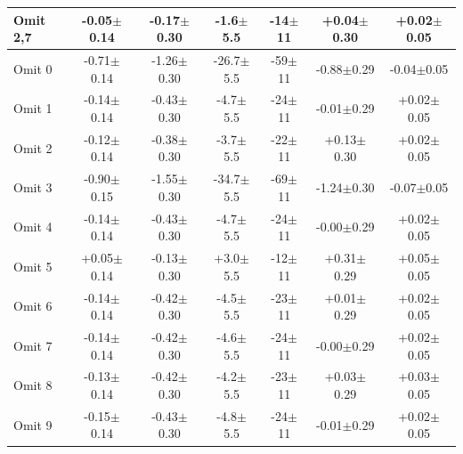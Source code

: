 \begin{landscape}
\begin{table}[!h]
\begin{center}
\begin{tabular}[h]{|l|c|c|c|c|c|c|}
Omit 2,7& -0.05$\pm$0.14& -0.17$\pm$0.30& -1.6$\pm$5.5& -14$\pm$11& +0.04$\pm$0.30& +0.02$\pm$0.05\\\hline
Omit 0& \color{red}-0.71$\pm$0.14& \color{red}-1.26$\pm$0.30& \color{red}-26.7$\pm$5.5& \color{red}-59$\pm$11& -0.88$\pm$0.29& -0.04$\pm$0.05\\\hline
Omit 1& -0.14$\pm$0.14& -0.43$\pm$0.30& -4.7$\pm$5.5& -24$\pm$11& -0.01$\pm$0.29& +0.02$\pm$0.05\\\hline
Omit 2& -0.12$\pm$0.14& -0.38$\pm$0.30& -3.7$\pm$5.5& -22$\pm$11& +0.13$\pm$0.30& +0.02$\pm$0.05\\\hline
Omit 3& \color{red}-0.90$\pm$0.15& \color{red}-1.55$\pm$0.30& \color{red}-34.7$\pm$5.5& \color{red}-69$\pm$11& \color{red}-1.24$\pm$0.30& -0.07$\pm$0.05\\\hline
Omit 4& -0.14$\pm$0.14& -0.43$\pm$0.30& -4.7$\pm$5.5& -24$\pm$11& -0.00$\pm$0.29& +0.02$\pm$0.05\\\hline
Omit 5& +0.05$\pm$0.14& -0.13$\pm$0.30& +3.0$\pm$5.5& -12$\pm$11& +0.31$\pm$0.29& +0.05$\pm$0.05\\\hline
Omit 6& -0.14$\pm$0.14& -0.42$\pm$0.30& -4.5$\pm$5.5& -23$\pm$11& +0.01$\pm$0.29& +0.02$\pm$0.05\\\hline
Omit 7& -0.14$\pm$0.14& -0.42$\pm$0.30& -4.6$\pm$5.5& -24$\pm$11& -0.00$\pm$0.29& +0.02$\pm$0.05\\\hline
Omit 8& -0.13$\pm$0.14& -0.42$\pm$0.30& -4.2$\pm$5.5& -23$\pm$11& +0.03$\pm$0.29& +0.03$\pm$0.05\\\hline
Omit 9& -0.15$\pm$0.14& -0.43$\pm$0.30& -4.8$\pm$5.5& -24$\pm$11& -0.01$\pm$0.29& +0.02$\pm$0.05\\\hline
\end{tabular}
\end{center}
\label{tab:run2_residual_correlations_table}
\end{table}
\begin{figure}[ht]
\centering
{}

\end{figure}
\end{landscape}
